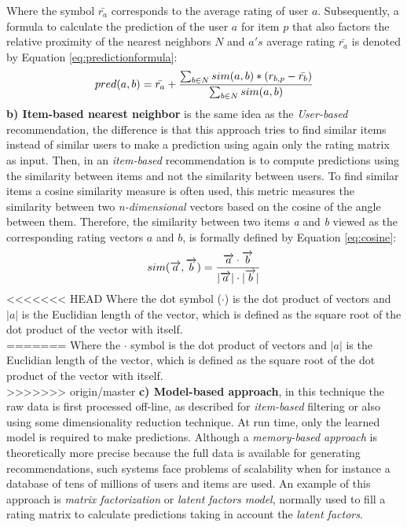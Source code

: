 Where the symbol $\bar{r_a}$ corresponds to the average rating of user
$a$. Subsequently, a formula to calculate the prediction of the user
$a$ for item $p$ that also factors the relative proximity of the
nearest neighbors $N$ and $a's$ average rating $\bar{r_a}$ is denoted
by Equation \ref{eq:predictionformula}:
\begin{equation}\label{eq:predictionformula}
\displaystyle pred(a,b) = \bar{r_a} + 
{\sum_{b \in N} sim(a,b) * (r_{b,p}- \bar{r_b}) 
\over \sum_{b \in N} sim(a,b)} 
\end{equation}
\textbf{b) Item-based nearest neighbor} is the same idea as the \textit
{User-based} recommendation, the difference is that this approach tries to find
similar items instead of similar users to make a prediction using again only the rating
matrix as input. Then, in an \textit{item-based} recommendation is to compute
predictions using the similarity between items and not the similarity
between users. To find similar items a cosine similarity measure is often used,
this metric measures the similarity between two
\textit{n-dimensional} vectors based on the cosine of the angle between them.
Therefore, the similarity between two items \textit{a} and \textit{b}
viewed as the corresponding rating vectors $a$ and $b$, is formally
defined by Equation \ref{eq:cosine}:
\begin{equation}\label{eq:cosine}
\displaystyle sim(\overrightarrow{a},\overrightarrow{b})= 
{\overrightarrow{a} \cdot \overrightarrow{b} \over
|\overrightarrow{a}| \cdot |\overrightarrow{b}| }
\end{equation}
<<<<<<< HEAD
Where the dot symbol ($\cdot$) is the dot product of vectors and $|a|$ 
is the Euclidian length of the vector, which is defined as the 
square root of the dot product of the vector with itself.\\
=======
Where the $\cdot$  symbol is the dot product of vectors and $|a|$ is the Euclidian length of the vector, which is defined as the square root of the dot
product of the vector with itself.\\
>>>>>>> origin/master
\textbf{c) Model-based approach}, in this technique the raw data is
first processed off-line, as described for \textit{item-based}
filtering or also using some dimensionality reduction technique. At run time,
only the learned model is required to make predictions. Although a
\textit{memory-based approach} is theoretically more precise because
the full data is available for generating recommendations, such systems
face problems of scalability when for instance a database of tens of 
millions of users and items are used. An example of this approach is
\textit{matrix factorization} or \textit{latent factors model},
normally used to fill a rating matrix to calculate predictions taking
in account the \textit{latent factors}.

